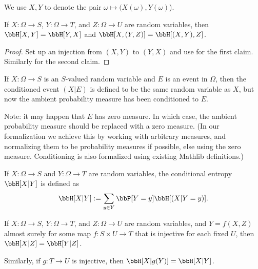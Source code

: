 We use $X,Y$ to denote the pair $\omega \mapsto (X(\omega),Y(\omega)$).

\begin{lemma}
  \label{entropy-comm}
  \leanok
  If $X: \Omega \to S$, $Y: \Omega \to T$, and $Z: \Omega \to U$ are random variables, then $\bbH[X, Y] = \bbH[Y, X]$ and $\bbH[X, (Y,Z)] = \bbH[(X,Y), Z]$.
\end{lemma}
\begin{proof}
  \leanok
  Set up an injection from $(X,Y)$ to $(Y,X)$ and use  for the first claim. Similarly for the second claim.
\end{proof}


\begin{definition}
  \label{condition-event-def}
  \leanok
  If $X: \Omega \to S$ is an $S$-valued random variable and $E$ is an event in $\Omega$, then the conditioned event $(X|E)$ is defined to be the same random variable as $X$, but now the ambient probability measure has been conditioned to $E$.
\end{definition}

Note: it may happen that $E$ has zero measure.  In which case, the ambient probability measure should be replaced with a zero measure.  (In our formalization we achieve this by working with arbitrary measures, and normalizing them to be probability measures if possible, else using the zero measure.  Conditioning is also formalized using existing Mathlib definitions.)

\begin{definition}
  \label{conditional-entropy-def}
  \leanok
  If $X: \Omega \to S$ and $Y: \Omega \to T$ are random variables, the conditional entropy $\bbH[X|Y]$ is defined as
  $$ \bbH[X|Y] := \sum_{y \in Y} \bbP[Y = y] \bbH[(X | Y=y)].$$
\end{definition}

\begin{lemma}\label{relabeled-entropy-cond}
  \leanok
  If $X: \Omega \to S$, $Y: \Omega \to T$, and $Z: \Omega \to U$ are random variables, and $Y = f(X,Z)$ almost surely for some map $f: S \times U \to T$ that is injective for each fixed $U$, then $\bbH[X|Z] = \bbH[Y|Z]$.

  Similarly, if $g: T \to U$ is injective, then $\bbH[X|g(Y)] = \bbH[X|Y]$.
\end{lemma}


